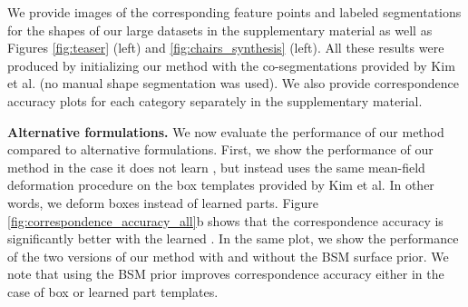 We provide images of the corresponding feature points and labeled segmentations for the shapes of our large datasets in the supplementary material as well as Figures \ref{fig:teaser} (left) and \ref{fig:chairs_synthesis} (left). All these results were produced by initializing our method with the co-segmentations provided by Kim et al. (no manual shape segmentation was used). We also provide correspondence accuracy plots for each category separately in the supplementary material. 




\textbf{Alternative formulations.} We now evaluate the performance of our method compared to alternative formulations. First, we show the performance of our method in the case it does not learn , but instead uses the same mean-field deformation procedure on the box templates provided by Kim et al. In other words, we deform boxes instead of learned parts. Figure \ref{fig:correspondence_accuracy_all}b shows that the correspondence accuracy is significantly better with the learned . In the same plot, we show the performance of the two versions of our method with and without the BSM surface prior. We note that using the BSM prior improves correspondence accuracy either in the case of box or learned part templates. 



 
